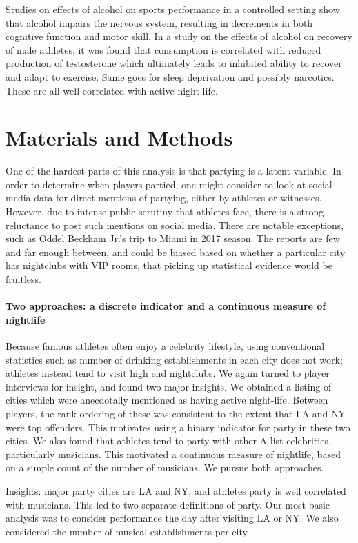 \documentclass[letterpaper,12pt]{article}
\begin{document}
Studies on effects of alcohol on sports performance in a controlled setting
show that alcohol impairs the nervous system, resulting in decrements in both
cognitive function and motor skill.\cite{shirreffs} In a study on 
the effects of alcohol on recovery of male athletes, it was found that
consumption is correlated with reduced production of testosterone
which ultimately leads to inhibited ability to recover and adapt to exercise.\cite{mjbarnes}
Same goes for sleep deprivation and possibly narcotics. 
These are all well correlated with active night life.

\section{Materials and Methods}
One of the hardest parts of this analysis is that partying is a latent variable.
In order to determine when players partied, one might consider to look at social media data
for direct mentions of partying, either by athletes or witnesses. However, due to
intense public scrutiny that athletes face, there is a strong reluctance to post
such mentions on social media. There are notable exceptions, such
as Oddel Beckham Jr.'s trip to Miami in 2017 season.\cite{bleler}
The reports are few and far enough between,
and could be biased based on whether a particular city has nightclubs with VIP rooms,
that picking up statistical evidence would be fruitless.

\paragraph{Two approaches: a discrete indicator and a continuous measure of nightlife}
Because famous athletes often enjoy a celebrity lifestyle, using conventional statistics
such as number of drinking establishments in each city does not work; athletes instead
tend to visit high end nightclubs. We again turned to player interviews for insight,
and found two major insights. We obtained a listing of cities which were anecdotally
mentioned as having active night-life. Between players, the rank ordering of these
was consistent to the extent that LA and NY were top
offenders. This motivates using a binary indicator for party in these two cities. 
We also found that athletes tend to party with other A-list celebrities,
particularly musicians. This motivated a continuous measure of nightlife, based on a
simple count of the number of musicians. We pursue both approaches.


Insights: major party cities are LA and NY, and athletes party is well correlated with musicians. This led to two separate definitions of party. Our most basic analysis was to consider performance 
the day after visiting LA or NY.
We also considered the number of musical establishments per city. 
\end{document}
